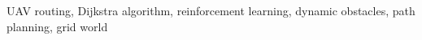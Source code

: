 \documentclass[conference]{IEEEtran}
\begin{document}
\begin{IEEEkeywords}
UAV routing, Dijkstra algorithm, reinforcement learning, dynamic obstacles, path planning, grid world
\end{IEEEkeywords}











\end{document}
